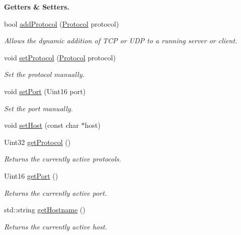\begin{Indent}{\bf Getters \& Setters.}\par
\begin{DoxyCompactItemize}
\item 
bool \hyperlink{classNetManager_a444e45de6f806c4c27d7f9915f898329}{add\-Protocol} (\hyperlink{NetManager_8h_a9af285d1232beed01f31aac5d3a5469f}{Protocol} protocol)
\begin{DoxyCompactList}\small\item\em Allows the dynamic addition of T\-C\-P or U\-D\-P to a running server or client. \end{DoxyCompactList}\item 
void \hyperlink{classNetManager_af370ee8343ff23121c0c2f180c34dabc}{set\-Protocol} (\hyperlink{NetManager_8h_a9af285d1232beed01f31aac5d3a5469f}{Protocol} protocol)
\begin{DoxyCompactList}\small\item\em Set the protocol manually. \end{DoxyCompactList}\item 
void \hyperlink{classNetManager_af5db4e28511390202b17f6d711f42d83}{set\-Port} (Uint16 port)
\begin{DoxyCompactList}\small\item\em Set the port manually. \end{DoxyCompactList}\item 
void \hyperlink{classNetManager_a47666370887fee3b2fa27ae7bff1065f}{set\-Host} (const char $\ast$host)
\item 
Uint32 \hyperlink{classNetManager_a3c941b21b356a166f2ebbdd522dc792d}{get\-Protocol} ()
\begin{DoxyCompactList}\small\item\em Returns the currently active protocols. \end{DoxyCompactList}\item 
Uint16 \hyperlink{classNetManager_aa6924b10800963247c025870b1116a62}{get\-Port} ()
\begin{DoxyCompactList}\small\item\em Returns the currently active port. \end{DoxyCompactList}\item 
std\-::string \hyperlink{classNetManager_a48f65145e8b867f413849e4dd413974e}{get\-Hostname} ()
\begin{DoxyCompactList}\small\item\em Returns the currently active host. \end{DoxyCompactList}\item 

\end{DoxyCompactItemize}
\end{Indent}
